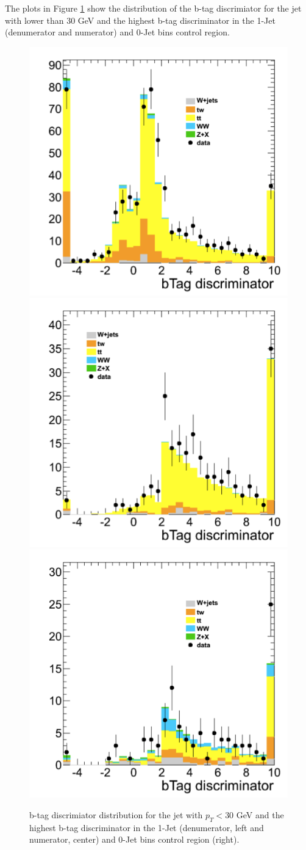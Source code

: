 The plots in Figure \ref{fig:jetLowBtag} show the distribution of the b-tag discrimiator for 
the jet with \pt lower than 30 GeV and the highest b-tag discriminator 
in the 1-Jet (denumerator and numerator) and 0-Jet bins control region.

\begin{figure}[hbt]
\begin{center}
\includegraphics[width=0.3\linewidth]{figures/jetLowBtag_denum_dr.png} 
\includegraphics[width=0.3\linewidth]{figures/jetLowBtag_num_dr.png}
\includegraphics[width=0.3\linewidth]{figures/jetLowBtag_topTag_dr.png}
\caption{\label{fig:jetLowBtag}\protect b-tag discrimiator distribution for 
the jet with $p_T<30$ GeV and the highest b-tag discriminator in the 1-Jet (denumerator, left and numerator, center) 
and 0-Jet bins control region (right).}
\end{center}
\end{figure}
